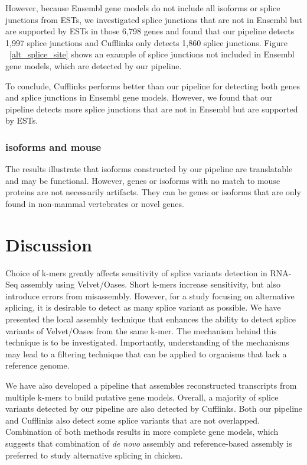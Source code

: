 \documentclass[10pt]{article}
\begin{document}
However, because Ensembl gene models do not include all isoforms or
splice junctions from ESTs, we investigated splice junctions that are
not in Ensembl but are supported by ESTs in those 6,798 genes and
found that our pipeline detects 1,997 splice junctions and Cufflinks
only detects 1,860 splice junctions.
Figure ~\ref{alt_splice_site} shows an example of splice junctions not
included in Ensembl gene models, which are detected by our pipeline.

To conclude, Cufflinks performs better than our pipeline for detecting
both genes and splice junctions in Ensembl gene models.
However, we found that our pipeline detects more splice junctions
that are not in Ensembl but are supported by ESTs.

\subsubsection{isoforms and mouse}

The results illustrate that isoforms constructed
by our pipeline are translatable and may be functional.  However,
genes or isoforms with no match to mouse proteins are not necessarily
artifacts.  They can be genes or isoforms that are only found in
non-mammal vertebrates or novel genes.


\section*{Discussion}

Choice of k-mers greatly affects sensitivity of splice variants detection in RNA-Seq assembly using Velvet/Oases.
Short k-mers increase sensitivity, but also introduce errors from misassembly.
However, for a study focusing on alternative splicing, it is desirable to detect as many splice variant as possible.
We have presented the local assembly technique that enhances the ability to detect splice variants of Velvet/Oases from the same
k-mer.
The mechanism behind this technique is to be investigated.
Importantly, understanding of the mechanisms may lead to a filtering technique that can be applied to organisms that lack a reference genome.

We have also developed a pipeline that assembles reconstructed transcripts from multiple k-mers to build putative gene models.
Overall, a majority of splice variants detected by our pipeline are also detected by Cufflinks.
Both our pipeline and Cufflinks also detect some splice variants that are not overlapped.
Combination of both methods results in more complete gene models,
which suggests that combination of \emph{de novo} assembly and reference-based assembly is preferred to study alternative splicing in chicken.
\end{document}
